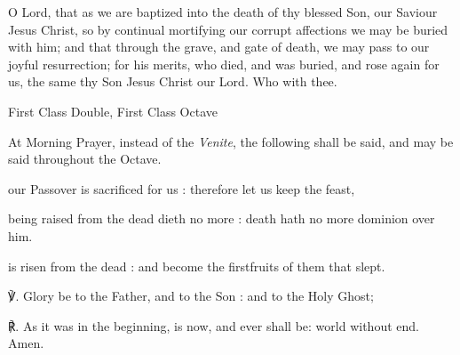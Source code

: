      O Lord, that as we are baptized into the death of thy blessed Son, our Saviour Jesus Christ, so by continual mortifying our corrupt affections we may be buried with him; and that through the grave, and gate of death, we may pass to our joyful resurrection; for his merits, who died, and was buried, and rose again for us, the same thy Son Jesus Christ our Lord. Who with thee.

\begin{inhead}
    {First Class Double, First Class Octave}
\end{inhead}

\label{pascha}
\begin{rubric}
    At Morning Prayer, instead of the \emph{Venite}, the following shall be said, and may be said throughout the Octave.
\end{rubric}
 our Passover is sacrificed for us : therefore let us keep the feast,
    

 being raised from the dead dieth no more : death hath no more dominion over him.
    

 is risen from the dead : and become the firstfruits of them that slept.

\par
℣. Glory be to the Father, and to the Son : and to the Holy Ghost;\par
℟. As it was in the beginning, is now, and ever shall be: world without end. Amen.

